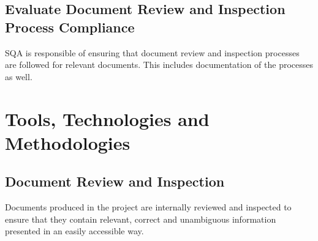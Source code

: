 \documentclass{article}
\begin{document}
	\subsection{Evaluate Document Review and Inspection Process Compliance}
	SQA is responsible of ensuring that document review and inspection processes are followed for relevant documents. This includes documentation of the processes as well. 
	
	
	\begin{comment}
	\clearpage
	
	\section{Software Quality Assurance Records} \label{doc}
	The aim of the software quality assurance record (SQR) is to report activities performed as part of the quality assurance work defined in the SQAP. The SQR shall identify the activity performed, persons involved and documents or data assessed. The resulting observations, suggestions, deviations and/or actions shall also be included. 
	
	The SQR's produced shall be gathered in a software quality assurance summary. There, all SQA activities performed are listed with references to respective SQR. The summary shall include a conclusion regarding the adherence to SQAP that is continuously updated.
	\end{comment}
	
	\clearpage
	\section{Tools, Technologies and Methodologies} \label{method}
	
	\subsection{Document Review and Inspection}
	Documents produced in the project are internally reviewed and inspected to  ensure that they contain relevant, correct and unambiguous information presented in an easily accessible way.  
	
\end{document}
